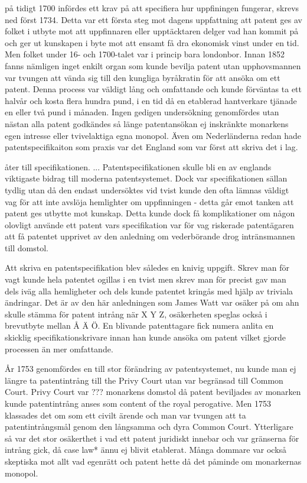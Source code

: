 på tidigt 1700 infördes ett krav på att specifiera hur uppfiningen fungerar, skrevs ned först 1734. Detta var ett första steg mot dagens uppfattning att patent ges av folket i utbyte mot att uppfinnaren eller upptäcktaren delger vad han kommit på och ger ut kunskapen i byte mot att ensamt få dra ekonomisk vinst under en tid. Men folket under 16- och 1700-talet var i princip bara londonbor. Innan 1852 fanns nämligen inget enkilt organ som kunde bevilja patent utan upphovsmannen var tvungen att vända sig till den kungliga byråkratin för att ansöka om ett patent. Denna process var väldigt lång och omfattande och kunde förväntas ta ett halvår och kosta flera hundra pund, i en tid då en etablerad hantverkare tjänade en eller två pund i månaden. Ingen gedigen undersökning genomfördes utan nästan alla patent godkändes så länge patentansökan ej inskränkte monarkens egen intresse eller tvivelaktiga egna monopol. Även om Nederländerna redan hade patentspecifikaiton som praxis var det England som var först att skriva det i lag. 

åter till specifikationen. ... 
Patentspecifikationen skulle bli en av englands viktigaste bidrag till moderna patentsystemet. Dock var specifikationen sällan tydlig utan då den endast undersöktes vid tvist kunde den ofta lämnas väldigt vag för att inte avslöja hemlighter om uppfinningen - detta går emot tanken att patent ges utbytte mot kunskap. Detta kunde dock få komplikationer om någon olovligt använde ett patent vars specifikation var för vag riskerade patentägaren att få patentet upprivet av den anledning om vederbörande drog intränsmannen till domstol. 

Att skriva en patentspecifikation blev således en knivig uppgift. Skrev man för vagt kunde hela patentet ogillas i en tvist men skrev man för precist gav man dels iväg alla hemligheter och dels kunde patentet kringås med hjälp av triviala ändringar. Det är av den här anledningen som James Watt var osäker på om ahn skulle stämma för patent intrång när X Y Z, osäkerheten speglas också i brevutbyte mellan Å Ä Ö. En blivande patenttagare fick numera anlita en skicklig specifikationskrivare innan han kunde ansöka om patent vilket gjorde processen än mer omfattande.

År 1753 genomfördes en till stor förändring av patentsystemet, nu kunde man ej längre ta patentintrång till the Privy Court utan var begränsad till Common Court. Privy Court var ??? monarkens domstol då patent beviljades av monarken kunde patentintrång anses som content of the royal perogative. Men 1753 klassades det om som ett civilt ärende och man var tvungen att ta patentintrångsmål genom den långsamma och dyra Common Court. Ytterligare så var det stor osäkerthet i vad ett patent juridiskt innebar och var gränserna för intrång gick, då case law* ännu ej blivit etablerat. Många dommare var också skeptiska mot allt vad egenrätt och patent hette då det påminde om monarkernas monopol.

